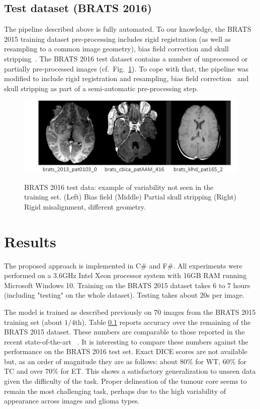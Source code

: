 \subsection{Test dataset (BRATS 2016)}

The pipeline described above is fully automated. To our knowledge, the BRATS 2015 training dataset pre-processing includes rigid registration (as well as resampling to a common image geometry), bias field correction and skull stripping~\cite{menze2015multimodal}. The BRATS 2016 test dataset contains a number of unprocessed or partially pre-processed images (cf.~Fig.~\ref{fig: test data}). To cope with that, the pipeline was modified to include rigid registration and resampling, bias field correction~\cite{tustison2009n4itk} and skull stripping as part of a semi-automatic pre-processing step.

\begin{figure}
\centering
\includegraphics[width=1\textwidth]{images/BRATS2016_example-data.png}
\label{fig: test data}
\caption{BRATS 2016 test data: example of variability not seen in the training set. (Left) Bias field (Middle) Partial skull stripping (Right) Rigid misalignment, different geometry.}
\end{figure}

\section{Results}
\label{sec: results}

The proposed approach is implemented in C\# and F\#. All experiments were performed on a 3.6GHz Intel Xeon processor system with 16GB RAM running Microsoft Windows 10. Training on the BRATS 2015 dataset takes $6$ to $7$ hours (including "testing" on the whole dataset). Testing takes about $20$s per image.

The model is trained as described previously on $70$ images from the BRATS 2015 training set (about $1/4$th). Table \ref{} reports accuracy over the remaining of the BRATS 2015 dataset. These numbers are comparable to those reported in the recent state-of-the-art \eg~\cite{kamnitsas2016efficient}. It is interesting to compare these numbers against the performance on the BRATS 2016 test set. Exact DICE scores are not available but, as an order of magnitude they are as follows: about $80\%$ for WT, $60\%$ for TC and over $70\%$ for ET. This shows a satisfactory generalization to unseen data given the difficulty of the task. Proper delineation of the tumour core seems to remain the most challenging task, perhaps due to the high variability of appearance across images and glioma types.

